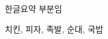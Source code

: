 \documentclass[master,english,final,pdfdoc]{dgist-ucs}
\begin{document}

\clearpage
\summarykorean
\begin{summary}      

    한글요약 부분임

\end{summary}

\begin{Korkeyword}
	치킨, 피자, 족발, 순대, 국밥
\end{Korkeyword}



\label{paperlastpagelabel} %
\end{document}
